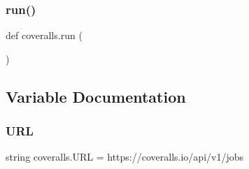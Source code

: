 \mbox{\label{namespacecoveralls_a6051bbd0ea5955b9aee5d114251bfa1f}} 
\subsubsection{\texorpdfstring{run()}{run()}}
{\footnotesize\ttfamily def coveralls.\+run (\begin{DoxyParamCaption}{ }\end{DoxyParamCaption})}



\subsection{Variable Documentation}
\mbox{\label{namespacecoveralls_af5840fd4c6511f08aec2ba4f6af20206}} 
\subsubsection{\texorpdfstring{URL}{URL}}
{\footnotesize\ttfamily string coveralls.\+U\+RL = \textquotesingle{}https\+://coveralls.\+io/api/v1/jobs\textquotesingle{}}

